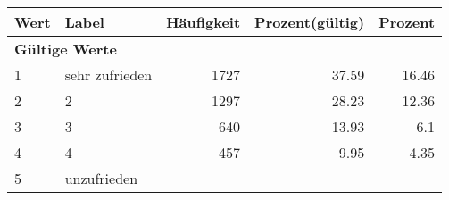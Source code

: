      \begin{longtable}{lXrrr}
     \toprule
     \textbf{Wert} & \textbf{Label} & \textbf{Häufigkeit} & \textbf{Prozent(gültig)} & \textbf{Prozent} \\
     \endhead
     \midrule
     \multicolumn{5}{l}{\textbf{Gültige Werte}}\\

     1 &
     \multicolumn{1}{X}{ sehr zufrieden   } &


       \num{1727} &
       \num[round-mode=places,round-precision=2]{37.59} &
         \num[round-mode=places,round-precision=2]{16.46} \\

     2 &
     \multicolumn{1}{X}{ 2   } &


       \num{1297} &
       \num[round-mode=places,round-precision=2]{28.23} &
         \num[round-mode=places,round-precision=2]{12.36} \\

     3 &
     \multicolumn{1}{X}{ 3   } &


       \num{640} &
       \num[round-mode=places,round-precision=2]{13.93} &
         \num[round-mode=places,round-precision=2]{6.1} \\

     4 &
     \multicolumn{1}{X}{ 4   } &


       \num{457} &
       \num[round-mode=places,round-precision=2]{9.95} &
         \num[round-mode=places,round-precision=2]{4.35} \\

     5 &
     \multicolumn{1}{X}{ unzufrieden   } &



\end{longtable}
